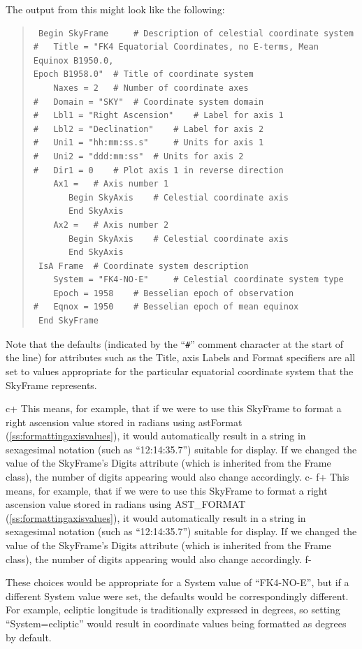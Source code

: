 \documentclass[twoside,11pt]{article}
\newcommand{\secref}[1]{\S\ref{#1}}
\renewcommand{\secref}[1]{\ref{#1}}
\begin{document}
The output from this might look like the following:

\begin{quote}
\begin{verbatim}
 Begin SkyFrame 	# Description of celestial coordinate system
#   Title = "FK4 Equatorial Coordinates, no E-terms, Mean Equinox B1950.0,
Epoch B1958.0" 	# Title of coordinate system
    Naxes = 2 	# Number of coordinate axes
#   Domain = "SKY" 	# Coordinate system domain
#   Lbl1 = "Right Ascension" 	# Label for axis 1
#   Lbl2 = "Declination" 	# Label for axis 2
#   Uni1 = "hh:mm:ss.s" 	# Units for axis 1
#   Uni2 = "ddd:mm:ss" 	# Units for axis 2
#   Dir1 = 0 	# Plot axis 1 in reverse direction
    Ax1 = 	# Axis number 1
       Begin SkyAxis 	# Celestial coordinate axis
       End SkyAxis
    Ax2 = 	# Axis number 2
       Begin SkyAxis 	# Celestial coordinate axis
       End SkyAxis
 IsA Frame 	# Coordinate system description
    System = "FK4-NO-E" 	# Celestial coordinate system type
    Epoch = 1958 	# Besselian epoch of observation
#   Eqnox = 1950 	# Besselian epoch of mean equinox
 End SkyFrame
\end{verbatim}
\end{quote}

Note that the defaults (indicated by the ``\verb?#?'' comment
character at the start of the line) for attributes such as the Title,
axis Labels and Format specifiers are all set to values appropriate
for the particular equatorial coordinate system that the SkyFrame
represents.

c+
This means, for example, that if we were to use this SkyFrame to
format a right ascension value stored in radians using astFormat
(\secref{ss:formattingaxisvalues}), it would automatically result in a
string in sexagesimal notation (such as ``12:14:35.7'') suitable for
display.  If we changed the value of the SkyFrame's Digits attribute
(which is inherited from the Frame class), the number of digits
appearing would also change accordingly.
c-
f+
This means, for example, that if we were to use this SkyFrame to
format a right ascension value stored in radians using AST\_FORMAT
(\secref{ss:formattingaxisvalues}), it would automatically result in a
string in sexagesimal notation (such as ``12:14:35.7'') suitable for
display.  If we changed the value of the SkyFrame's Digits attribute
(which is inherited from the Frame class), the number of digits
appearing would also change accordingly.
f-

These choices would be appropriate for a System value of ``FK4-NO-E'',
but if a different System value were set, the defaults would be
correspondingly different. For example, ecliptic longitude is
traditionally expressed in degrees, so setting ``System=ecliptic''
would result in coordinate values being formatted as degrees by
default.
\end{document}

